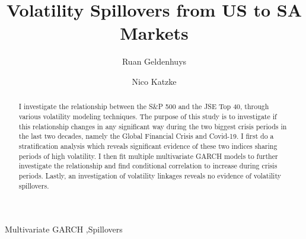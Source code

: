 \documentclass[11pt,preprint, authoryear]{elsarticle}
\numberwithin{equation}{section}
\numberwithin{figure}{section}
\numberwithin{table}{section}
\begin{document}
\begin{frontmatter}  %

\title{Volatility Spillovers from US to SA Markets}





\author[Add1]{Ruan Geldenhuys}

\author[Add1,Add2]{Nico Katzke}




\address[Add1]{Stellenbosch University, Stellenbosch, South Africa}
\address[Add2]{Stellenbosch University, Stellenbosch, South Africa}


\begin{abstract}
\small{
I investigate the relationship between the S\&P 500 and the JSE Top 40,
through various volatility modeling techniques. The purpose of this
study is to investigate if this relationship changes in any significant
way during the two biggest crisis periods in the last two decades,
namely the Global Financial Crisis and Covid-19. I first do a
stratification analysis which reveals significant evidence of these two
indices sharing periods of high volatility. I then fit multiple
multivariate GARCH models to further investigate the relationship and
find conditional correlation to increase during crisis periods. Lastly,
an investigation of volatility linkages reveals no evidence of
volatility spillovers.
}
\end{abstract}

\vspace{1cm}


\begin{keyword}
\footnotesize{
Multivariate GARCH \sep Spillovers \\
\vspace{0.3cm}
}
\end{keyword}



\vspace{0.5cm}

\end{frontmatter}

\setcounter{footnote}{0}



\pagestyle{fancy}
\chead{}
\rhead{}
\lfoot{}
\lhead{}
\cfoot{}
\end{document}
